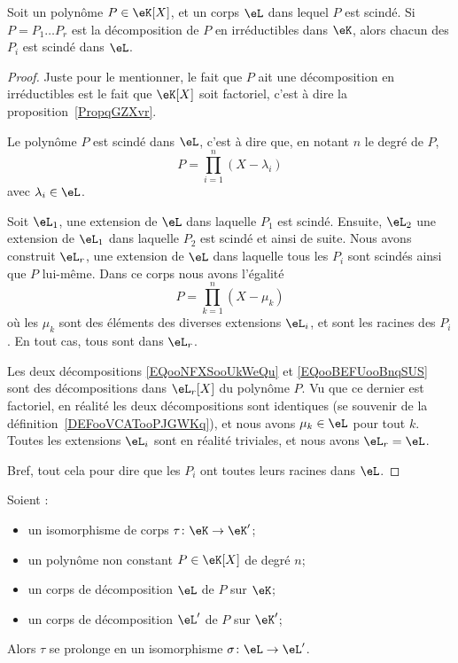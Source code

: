 \begin{lemma}        \label{LEMooJNGWooTXdGre}
    Soit un polynôme \( P\in \eK[X]\), et un corps \( \eL\) dans lequel \( P\) est scindé. Si \( P=P_1\ldots P_r\) est la décomposition de \( P\) en irréductibles dans \( \eK\), alors chacun des \( P_i\) est scindé dans \( \eL\).
\end{lemma}

\begin{proof}
    Juste pour le mentionner, le fait que \( P\) ait une décomposition en irréductibles est le fait que \( \eK[X]\) soit factoriel, c'est à dire la proposition~\ref{PropqGZXvr}.

    Le polynôme \( P\) est scindé dans \( \eL\), c'est à dire que, en notant \( n\) le degré de \( P\),
    \begin{equation}        \label{EQooNFXSooUkWeQu}
        P=\prod_{i=1}^n(X-\lambda_i)
    \end{equation}
    avec \( \lambda_i\in \eL\).

    Soit \( \eL_1\), une extension de \( \eL\) dans laquelle \( P_1\) est scindé. Ensuite, \( \eL_2\) une extension de \( \eL_1\) dans laquelle \( P_2\) est scindé et ainsi de suite. Nous avons construit \( \eL_r\), une extension de \( \eL\) dans laquelle tous les \( P_i\) sont scindés ainsi que \( P\) lui-même. Dans ce corps nous avons l'égalité
    \begin{equation}        \label{EQooBEFUooBnqSUS}
        P=\prod_{k=1}^n(X-\mu_k)
    \end{equation}
    où les \( \mu_k\) sont des éléments des diverses extensions \( \eL_i\), et sont les racines des \( P_i\). En tout cas, tous sont dans \( \eL_r\).

    Les deux décompositions \eqref{EQooNFXSooUkWeQu} et \eqref{EQooBEFUooBnqSUS} sont des décompositions dans \( \eL_r[X]\) du polynôme \( P\). Vu que ce dernier est factoriel, en réalité les deux décompositions sont identiques (se souvenir de la définition~\ref{DEFooVCATooPJGWKq}), et nous avons \( \mu_k\in \eL\) pour tout \( k\). Toutes les extensions \( \eL_i\) sont en réalité triviales, et nous avons \( \eL_r=\eL\).

    Bref, tout cela pour dire que les \( P_i\) ont toutes leurs racines dans \( \eL\).
\end{proof}

\begin{theorem}      \label{THOooQVKWooZAAYxK}
    Soient :
    \begin{itemize}
        \item un isomorphisme de corps \( \tau\colon \eK\to \eK'\);
        \item un polynôme non constant \( P\in \eK[X]\) de degré $n$;
        \item un corps de décomposition \( \eL\) de \( P\) sur \( \eK\);
        \item un corps de décomposition \( \eL'\) de \( P\) sur \( \eK'\);
    \end{itemize}
    Alors \( \tau\) se prolonge en un isomorphisme \( \sigma\colon \eL\to \eL'\).
\end{theorem}


